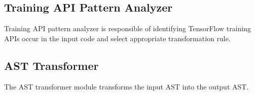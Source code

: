 \subsection{Training API Pattern Analyzer}

Training API pattern analyzer is responsible of identifying
TensorFlow training APIs occur in the input code and select appropriate
transformation rule.

\subsection{AST Transformer}

The AST transformer module transforms the input AST into the output AST.
